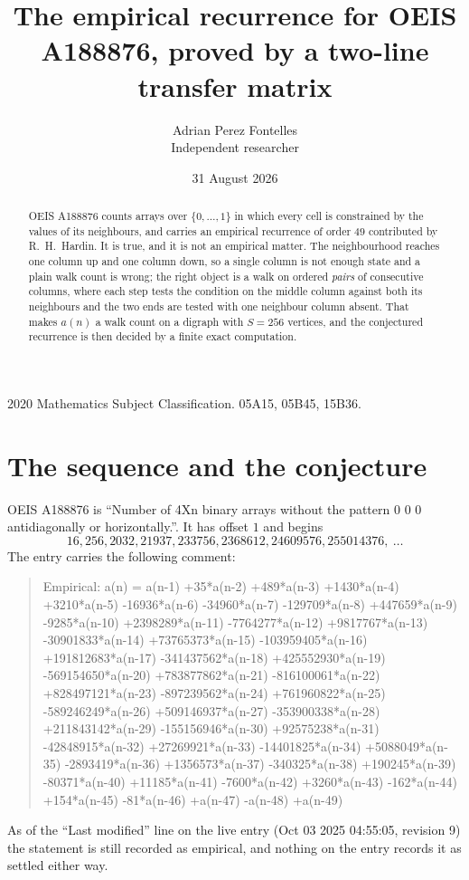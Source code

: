 \documentclass[11pt,a4paper]{article}
\title{The empirical recurrence for OEIS A188876, proved by a two-line transfer matrix}
\author{Adrian Perez Fontelles\\ \small Independent researcher}
\date{31 August 2026}
\theoremstyle{plain}
\theoremstyle{definition}
\begin{document}
\maketitle

\begin{abstract}
OEIS A188876 counts arrays over $\{0,\dots,1\}$ in which every cell is constrained by the
values of its neighbours, and carries an empirical recurrence of order $49$ contributed
by R.~H.~Hardin. It is true, and it is not an empirical matter. The neighbourhood reaches one
column up and one column down, so a single column is not enough state and a plain walk count
is wrong; the right object is a walk on ordered \emph{pairs} of consecutive columns, where
each step tests the condition on the middle column against both its neighbours and the two
ends are tested with one neighbour column absent. That makes $a(n)$ a walk count on a digraph
with $S=256$ vertices, and the conjectured recurrence is then decided by a finite exact
computation.
\end{abstract}

\noindent\small 2020 Mathematics Subject Classification. 05A15, 05B45, 15B36.\normalsize

\section{The sequence and the conjecture}

OEIS A188876 is ``Number of 4Xn binary arrays without the pattern 0 0 0 antidiagonally or horizontally.''. It has offset $1$ and begins
\[
16, 256, 2032, 21937, 233756, 2368612, 24609576, 255014376,\ \dots
\]
The entry carries the following comment:
\begin{quote}\small
Empirical: a(n) = a(n-1) +35*a(n-2) +489*a(n-3) +1430*a(n-4) +3210*a(n-5) -16936*a(n-6) -34960*a(n-7) -129709*a(n-8) +447659*a(n-9) -9285*a(n-10) +2398289*a(n-11) -7764277*a(n-12) +9817767*a(n-13) -30901833*a(n-14) +73765373*a(n-15) -103959405*a(n-16) +191812683*a(n-17) -341437562*a(n-18) +425552930*a(n-19) -569154650*a(n-20) +783877862*a(n-21) -816100061*a(n-22) +828497121*a(n-23) -897239562*a(n-24) +761960822*a(n-25) -589246249*a(n-26) +509146937*a(n-27) -353900338*a(n-28) +211843142*a(n-29) -155156946*a(n-30) +92575238*a(n-31) -42848915*a(n-32) +27269921*a(n-33) -14401825*a(n-34) +5088049*a(n-35) -2893419*a(n-36) +1356573*a(n-37) -340325*a(n-38) +190245*a(n-39) -80371*a(n-40) +11185*a(n-41) -7600*a(n-42) +3260*a(n-43) -162*a(n-44) +154*a(n-45) -81*a(n-46) +a(n-47) -a(n-48) +a(n-49)
\end{quote}
As of the ``Last modified'' line on the live entry (Oct 03 2025 04:55:05, revision 9) the statement is
still recorded as empirical, and nothing on the entry records it as settled either way.
\end{document}
